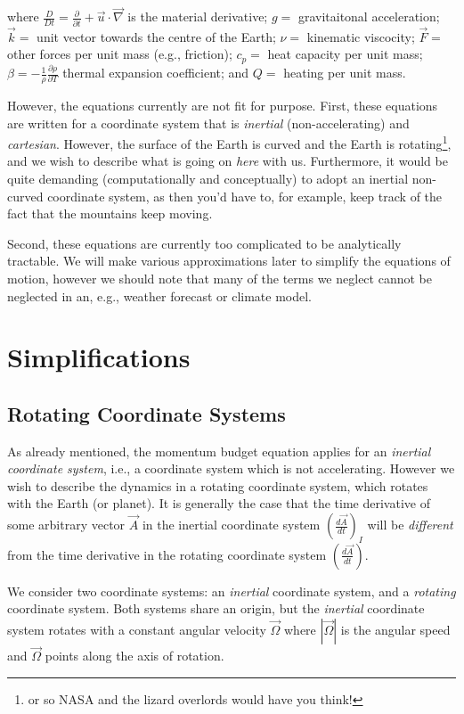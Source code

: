 \noindent where $\frac{D}{Dt}=\frac{\partial}{\partial t}+\vec{u}\cdot\vec{\nabla}$ is the material derivative; $g=$ gravitaitonal acceleration; $\vec{k}=$ unit vector towards the centre of the Earth; $\nu=$ kinematic viscocity; $\vec{F}=$ other forces per unit mass (e.g., friction); $c_p=$ heat capacity per unit mass; $\beta=-\frac{1}{\rho}\frac{\partial \rho}{\partial T}$ thermal expansion coefficient; and $Q=$ heating per unit mass.

However, the equations currently are not fit for purpose. First, these equations are written for a coordinate system that is \textit{inertial} (non-accelerating) and \textit{cartesian}. However, the surface of the Earth is curved and the Earth is rotating\footnote{or so NASA and the lizard overlords would have you think!}, and we wish to describe what is going on \textit{here} with us. Furthermore, it would be quite demanding (computationally and conceptually) to adopt an inertial non-curved coordinate system, as then you'd have to, for example, keep track of the fact that the mountains keep moving. 

Second, these equations are currently too complicated to be analytically tractable. We will make various approximations later to simplify the equations of motion, however we should note that many of the terms we neglect cannot be neglected in an, e.g., weather forecast or climate model. 

\section{Simplifications}

\subsection{Rotating Coordinate Systems}

As already mentioned, the momentum budget equation applies for an \textit{inertial coordinate system}, i.e., a coordinate system which is not accelerating. However we wish to describe the dynamics in a rotating coordinate system, which rotates with the Earth (or planet). It is generally the case that the time derivative of some arbitrary vector $\vec{A}$ in the inertial coordinate system $\left(\frac{d\vec{A}}{dt}\right)_I$ will be \textit{different} from the time derivative in the rotating coordinate system $\left(\frac{d\vec{A}}{dt}\right)$. 

We consider two coordinate systems: an \textit{inertial} coordinate system, and a \textit{rotating} coordinate system. Both systems share an origin, but the \textit{inertial} coordinate system rotates with a constant angular velocity $\vec{\Omega}$ where $|\vec{\Omega}|$ is the angular speed and $\vec{\Omega}$ points along the axis of rotation.

